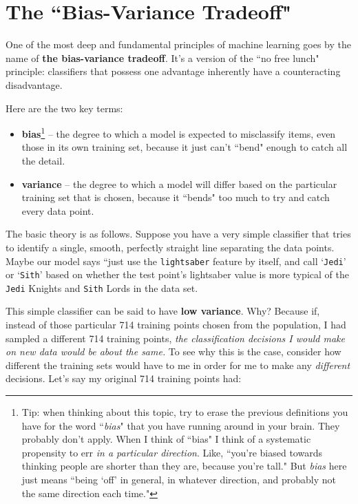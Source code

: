 \documentclass[12pt]{article}
\begin{document}
\section{The ``Bias-Variance Tradeoff"}

One of the most deep and fundamental principles of machine learning goes by
the name of \textbf{the bias-variance tradeoff}. It's a version of the ``no
free lunch" principle: classifiers that possess one advantage inherently have
a counteracting disadvantage.

Here are the two key terms:

\begin{itemize}
\itemsep.1em
\item \textbf{bias}\footnote{Tip: when thinking about this topic, try to erase the previous definitions you
have for the word ``\textit{bias}" that you have running around in your brain.
They probably don't apply. When I think of ``bias" I think of a systematic
propensity to err \textit{in a particular direction}. Like, ``you're biased
towards thinking people are shorter than they are, because you're tall." But
\textit{bias} here just means ``being `off' in general, in whatever direction,
and probably not the same direction each time."}
 -- the degree to which a model is expected to misclassify
items, even those in its own training set, because it just can't ``bend" 
enough to catch all the detail.
\item \textbf{variance} -- the degree to which a model will differ based on
the particular training set that is chosen, because it ``bends" too much to
try and catch every data point.
\end{itemize}

The basic theory is as follows. Suppose you have a very simple classifier that
tries to identify a single, smooth, perfectly straight line separating the
data points. Maybe our model says ``just use the \texttt{lightsaber} feature
by itself, and call `\texttt{Jedi}' or `\texttt{Sith}' based on whether the
test point's lightsaber value is more typical of the \texttt{Jedi} Knights and
\texttt{Sith} Lords in the data set.

This simple classifier can be said to have \textbf{low variance}. Why? Because
if, instead of those particular 714 training points chosen from the
population, I had sampled a different 714 training points, \textit{the
classification decisions I would make on new data would be about the same.} To
see why this is the case, consider how different the training sets would have
to me in order for me to make any \textit{different} decisions. Let's say my
original 714 training points had:
\end{document}
